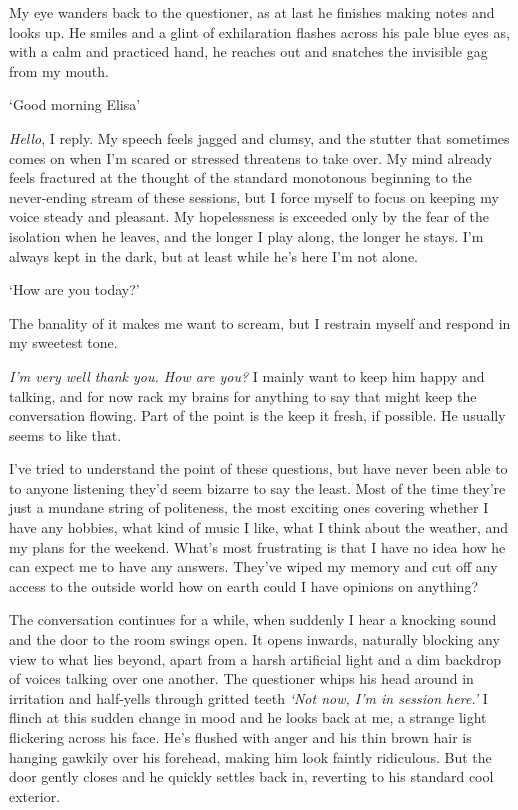 My eye wanders back to the questioner, as at last he finishes making
notes and looks up. He smiles and a glint of exhilaration flashes
across his pale blue eyes as, with a calm and practiced hand, he
reaches out and snatches the invisible gag from my mouth.

`Good morning Elisa'

\textit{Hello}, I reply. My speech feels jagged and clumsy, and the
stutter that sometimes comes on when I'm scared or stressed threatens
to take over. My mind already feels fractured at the thought of the
standard monotonous beginning to the never-ending stream of these
sessions, but I force myself to focus on keeping my voice steady and
pleasant. My hopelessness is exceeded only by the fear of the
isolation when he leaves, and the longer I play along, the longer he
stays. I'm always kept in the dark, but at least while he's here I'm
not alone.

`How are you today?'

The banality of it makes me want to scream, but I restrain myself and
respond in my sweetest tone.

\textit{I'm very well thank you. How are you?} I mainly want to keep
him happy and talking, and for now rack my brains for anything to say
that might keep the conversation flowing. Part of the point is the
keep it fresh, if possible. He usually seems to like that.

I've tried to understand the point of these questions, but have never
been able to \textemdash{} to anyone listening they'd seem bizarre to
say the least. Most of the time they're just a mundane string of
politeness, the most exciting ones covering whether I have any
hobbies, what kind of music I like, what I think about the weather,
and my plans for the weekend. What's most frustrating is that I have
no idea how he can expect me to have any answers. They've wiped my
memory and cut off any access to the outside world \textemdash{} how
on earth could I have opinions on anything?

The conversation continues for a while, when suddenly I hear a
knocking sound and the door to the room swings open. It opens inwards,
naturally blocking any view to what lies beyond, apart from a harsh
artificial light and a dim backdrop of voices talking over one
another. The questioner whips his head around in irritation and
half-yells through gritted teeth \textit{`Not now, I'm in session
here.'} I flinch at this sudden change in mood and he looks back at
me, a strange light flickering across his face. He's flushed with
anger and his thin brown hair is hanging gawkily over his forehead,
making him look faintly ridiculous. But the door gently closes and he
quickly settles back in, reverting to his standard cool exterior.

